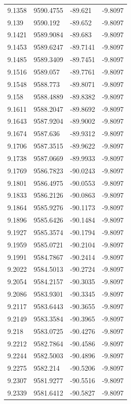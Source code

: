 \begin{table}[H]
\begin{tabular}{llll}
9.1358 & 9590.4755 & -89.621 & -9.8097 \\
9.139 & 9590.192 & -89.652 & -9.8097 \\
9.1421 & 9589.9084 & -89.683 & -9.8097 \\
9.1453 & 9589.6247 & -89.7141 & -9.8097 \\
9.1485 & 9589.3409 & -89.7451 & -9.8097 \\
9.1516 & 9589.057 & -89.7761 & -9.8097 \\
9.1548 & 9588.773 & -89.8071 & -9.8097 \\
9.158 & 9588.4889 & -89.8382 & -9.8097 \\
9.1611 & 9588.2047 & -89.8692 & -9.8097 \\
9.1643 & 9587.9204 & -89.9002 & -9.8097 \\
9.1674 & 9587.636 & -89.9312 & -9.8097 \\
9.1706 & 9587.3515 & -89.9622 & -9.8097 \\
9.1738 & 9587.0669 & -89.9933 & -9.8097 \\
9.1769 & 9586.7823 & -90.0243 & -9.8097 \\
9.1801 & 9586.4975 & -90.0553 & -9.8097 \\
9.1833 & 9586.2126 & -90.0863 & -9.8097 \\
9.1864 & 9585.9276 & -90.1173 & -9.8097 \\
9.1896 & 9585.6426 & -90.1484 & -9.8097 \\
9.1927 & 9585.3574 & -90.1794 & -9.8097 \\
9.1959 & 9585.0721 & -90.2104 & -9.8097 \\
9.1991 & 9584.7867 & -90.2414 & -9.8097 \\
9.2022 & 9584.5013 & -90.2724 & -9.8097 \\
9.2054 & 9584.2157 & -90.3035 & -9.8097 \\
9.2086 & 9583.9301 & -90.3345 & -9.8097 \\
9.2117 & 9583.6443 & -90.3655 & -9.8097 \\
9.2149 & 9583.3584 & -90.3965 & -9.8097 \\
9.218 & 9583.0725 & -90.4276 & -9.8097 \\
9.2212 & 9582.7864 & -90.4586 & -9.8097 \\
9.2244 & 9582.5003 & -90.4896 & -9.8097 \\
9.2275 & 9582.214 & -90.5206 & -9.8097 \\
9.2307 & 9581.9277 & -90.5516 & -9.8097 \\
9.2339 & 9581.6412 & -90.5827 & -9.8097 \\

\end{tabular}
\end{table}
